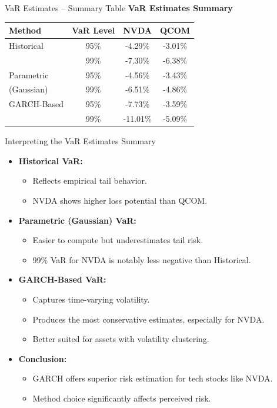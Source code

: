\documentclass{beamer}[9pt]
\begin{document}
\begin{frame}{VaR Estimates – Summary Table}
	\textbf{VaR Estimates Summary }
	\centering
	\begin{tabular}{lccc}
		\toprule
		\textbf{Method} & \textbf{VaR Level} & \textbf{NVDA} & \textbf{QCOM} \\
		\midrule
		Historical       & 95\%  & -4.29\%  & -3.01\% \\
		& 99\%  & -7.30\%  & -6.38\% \\
		Parametric       & 95\%  & -4.56\%  & -3.43\% \\
		(Gaussian)       & 99\%  & -6.51\%  & -4.86\% \\
		GARCH-Based      & 95\%  & -7.73\%  & -3.59\% \\
		& 99\%  & -11.01\% & -5.09\% \\
		\bottomrule
	\end{tabular}
\end{frame}

\begin{frame}{Interpreting the VaR Estimates Summary}
	\begin{itemize}
		\item \textbf{Historical VaR:} 
		\begin{itemize}
			\item Reflects empirical tail behavior.
			\item NVDA shows higher loss potential than QCOM.
		\end{itemize}
		
		\item \textbf{Parametric (Gaussian) VaR:}
		\begin{itemize}
			\item Easier to compute but underestimates tail risk.
			\item 99\% VaR for NVDA is notably less negative than Historical.
		\end{itemize}
		
		\item \textbf{GARCH-Based VaR:}
		\begin{itemize}
			\item Captures time-varying volatility.
			\item Produces the most conservative estimates, especially for NVDA.
			\item Better suited for assets with volatility clustering.
		\end{itemize}
		
		\item \textbf{Conclusion:}
		\begin{itemize}
			\item GARCH offers superior risk estimation for tech stocks like NVDA.
			\item Method choice significantly affects perceived risk.
		\end{itemize}
	\end{itemize}
\end{frame}
\end{document}
